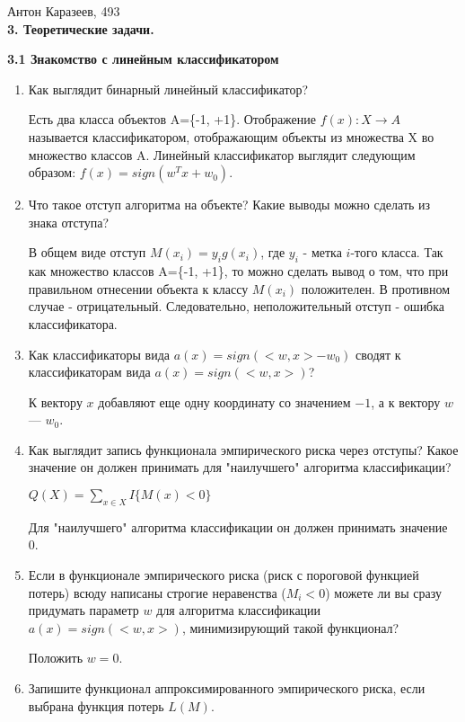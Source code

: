 \documentclass[12pt]{article}
\begin{document}
	Антон Каразеев, 493\\
	
	\textbf{3. Теоретические задачи.}
	
	\textbf{3.1 Знакомство с линейным классификатором}
	
	\begin{enumerate}
		\item Как выглядит бинарный линейный классификатор?
			
			Есть два класса объектов A=\{-1, +1\}. Отображение $f(x): X \rightarrow A$ называется классификатором, отображающим объекты из множества X во множество классов A. Линейный классификатор выглядит следующим образом: $f(x) = sign(w^Tx + w_0)$.
		
		\item Что такое отступ алгоритма на объекте? Какие выводы можно сделать из знака отступа?
			
			В общем виде отступ $M(x_i) = y_i g(x_i)$, где $y_i$ - метка $i$-того класса. Так как множество классов A=\{-1, +1\}, то можно сделать вывод о том, что при правильном отнесении объекта к классу $M(x_i)$ положителен. В противном случае - отрицательный. Следовательно, неположительный отступ - ошибка классификатора.
			
		\item Как классификаторы вида $a(x)=sign(<w,x> - w_0)$ сводят к классификаторам вида $a(x)=sign(<w,x>)$?
			
			К вектору $x$ добавляют еще одну координату со значением $-1$, а к вектору $w$ --- $w_0$.
			
		\item Как выглядит запись функционала эмпирического риска через отступы? Какое значение он должен принимать для "наилучшего" алгоритма классификации?
		
			$Q(X) = \sum_{x \in X} I\{M(x) < 0\}$
			
			Для "наилучшего" алгоритма классификации он должен принимать значение 0.
			
		\item Если в функционале эмпирического риска (риск с пороговой функцией потерь) всюду написаны строгие неравенства ($M_i < 0$) можете ли вы сразу  придумать параметр $w$ для алгоритма классификации $a(x) = sign(<w, x>)$, минимизирующий такой функционал?
		
			Положить $w=0$.
		
		\item Запишите функционал аппроксимированного эмпирического риска, если выбрана функция потерь $L(M)$.
		
		
		
		
	\end{enumerate}
\end{document}
